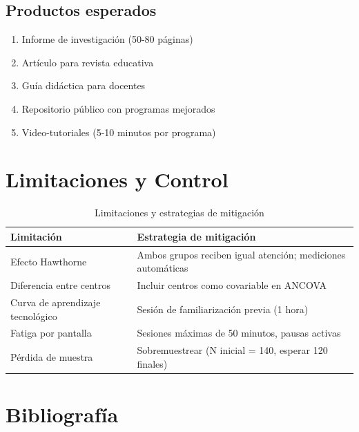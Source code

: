 \documentclass[12pt,spanish]{article}
\begin{document}
\subsection{Productos esperados}

\begin{enumerate}
    \item Informe de investigación (50-80 páginas)
    \item Artículo para revista educativa
    \item Guía didáctica para docentes
    \item Repositorio público con programas mejorados
    \item Video-tutoriales (5-10 minutos por programa)
\end{enumerate}

\newpage
\section{Limitaciones y Control}

\begin{table}[H]
\centering
\caption{Limitaciones y estrategias de mitigación}
\label{tab:limitaciones}
\begin{tabular}{|p{5cm}|p{8cm}|}
\hline
\textbf{Limitación} & \textbf{Estrategia de mitigación} \\
\hline
Efecto Hawthorne & Ambos grupos reciben igual atención; mediciones automáticas \\
\hline
Diferencia entre centros & Incluir centros como covariable en ANCOVA \\
\hline
Curva de aprendizaje tecnológico & Sesión de familiarización previa (1 hora) \\
\hline
Fatiga por pantalla & Sesiones máximas de 50 minutos, pausas activas \\
\hline
Pérdida de muestra & Sobremuestrear (N inicial = 140, esperar 120 finales) \\
\hline
\end{tabular}
\end{table}

\newpage
\section{Bibliografía}
\end{document}
